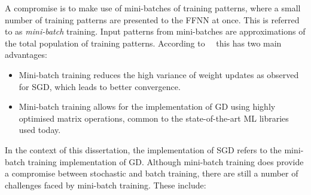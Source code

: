 A compromise is to make use of mini-batches of training patterns, where a small number of training patterns are presented to the \acs{FFNN} at once. This is referred to as \textit{mini-batch} training. Input patterns from mini-batches are approximations of the total population of training patterns. According to~\citeauthor{ref:ruder:2016}~\cite{ref:ruder:2016} this has two main advantages:

\begin{itemize}
      \item Mini-batch training reduces the high variance of weight updates as observed for \acs{SGD}, which leads to better convergence.

      \item Mini-batch training allows for the implementation of \acs{GD} using highly optimised matrix operations, common to the state-of-the-art \acs{ML} libraries used today.
\end{itemize}

In the context of this dissertation, the implementation of \acs{SGD} refers to the mini-batch training implementation of \acs{GD}. Although mini-batch training does provide a compromise between stochastic and batch training, there are still a number of challenges faced by mini-batch training. These include:

